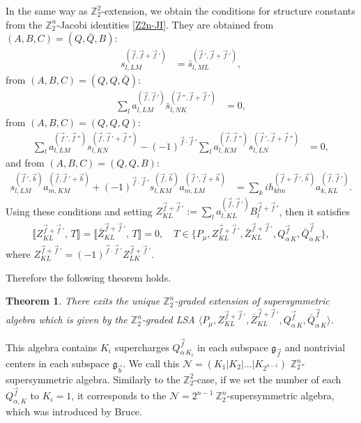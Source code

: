 \documentclass[a4paper,12pt]{article}
\def\Z{\mathbb{Z}}
\def\ua{\alpha}
\def\g{\mathfrak{g}}
\theoremstyle{plain}
\newtheorem{thm}{Theorem}
\theoremstyle{definition}
\begin{document}
In the same way as $\Z_2^2$-extension, we obtain  the conditions for structure constants from the $\Z_2^n$-Jacobi identities \eqref{Z2n-JI}. They are obtained from $(A,B,C)=(Q,\bar Q, B)$:
\begin{align}
 s_{l,LM}^{(\vec{f},\vec{f}+\vec{f}\,')}
&= \bar s_{l,ML}^{(\vec{f}\,',\vec{f}+\vec{f}\,')}
,
\end{align}
from $(A,B,C)=(Q, Q,\bar Q)$:
\begin{align}
 \sum_{l} a^{(\vec{f},\vec{f}\,')}_{l,LM} \bar s^{(\vec{f}\,'',\vec{f}+\vec{f}\,')}_{l,NK} &= 0 
,
\end{align}
from $(A,B,C)=(Q, Q, Q)$:
\begin{align}
 \sum_{l} a^{(\vec{f}\,',\vec{f}\,'')}_{l,LM} s^{(\vec{f},\vec{f}\,'+\vec{f}\,'')}_{l,KN} -(-1)^{\vec{f}\cdot\vec{f}\,'} \sum_l a^{(\vec{f},\vec{f}\,'')}_{l,KM} s^{(\vec{f}\,',\vec{f}+\vec{f}\,'')}_{l,LN} 
&= 0 
,
\end{align}
and from $(A,B,C)=(Q, Q, B)$:
\begin{align}
 s^{(\vec{f}\,',\vec{b})}_{l,LM}a^{(\vec{f},\vec{f}\,'+\vec{b})}_{m,KM}+(-1)^{\vec{f}\cdot\vec{f}\,'}s^{(\vec{f},\vec{b})}_{l,KM}a^{(\vec{f}\,',\vec{f}+\vec{b})}_{m,LM}&= \sum_{k} ih^{(\vec{f}+\vec{f}\,',\vec{b})}_{klm}a^{(\vec{f},\vec{f}\,')}_{k,KL}
.
\end{align}
Using these conditions and setting $Z_{KL}^{\vec{f}+\vec{f}\,'}:=\sum_l a^{(\vec{f},\vec{f}\,')}_{l,KL} B^{\vec{f}+\vec{f}\,'}_l$, then it satisfies
\begin{align}
 \llbracket Z_{KL}^{\vec{f}+\vec{f}\,'} ,\, T \rrbracket =
 \llbracket \bar Z_{KL}^{\vec{f}+\vec{f}\,'} ,\, T \rrbracket =0
,\quad
T\in\{P_\mu, Z_{KL}^{\vec{f}+\vec{f}\,'}, \bar Z_{KL}^{\vec{f}+\vec{f}\,'}, Q_{\ua\, K}^{\vec{f}}, \bar Q_{\ua\, K}^{\vec{f}}\},
\end{align}
where $Z_{KL}^{\vec{f}+\vec{f}\,'}=(-1)^{\vec{f}\cdot\vec{f}\,'}Z_{LK}^{\vec{f}+\vec{f}\,'}$.

Therefore the following theorem holds.
\begin{thm}
There exits the unique $\Z_2^n$-graded extension of supersymmetric algebra which is given by the $\Z_2^n$-graded LSA $\langle P_\mu, Z_{KL}^{\vec{f}+\vec{f}\,'}, \bar Z_{KL}^{\vec{f}+\vec{f}\,'}, Q_{\ua\, K}^{\vec{f}}, \bar Q_{\ua\, K}^{\vec{f}} \rangle$. 
\end{thm}
This algebra contains $K_i$ supercharges $Q_{\ua\, K_i}^{\vec{f}}$ in each subspace $\g_{\vec{f}}$ and nontrivial centers in each subspace $\mathfrak{g}_{\vec{b}}$. We call this $\mathcal{N}=(K_1| K_2| ... |K_{2^{n-1}})$ $\Z_2^n$-supersymmetric algebra.
Similarly to the $\Z_2^2$-case, if we set the number of each $Q_{\ua, K}^{\vec{f}}$ to $K_i=1$, it corresponds to the $\mathcal{N}=2^{n-1}\ \Z_2^n$-supersymmetric algebra, which was introduced by Bruce\cite{Bruce}. 
\end{document}
